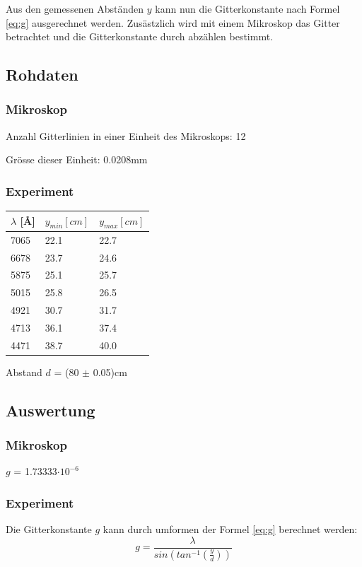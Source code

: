 \documentclass[12pt,a4paper]{article}
\begin{document}
Aus den gemessenen Abst\"anden $y$ kann nun die Gitterkonstante nach Formel \ref{eq:g} ausgerechnet werden. Zus\"astzlich wird mit einem Mikroskop das Gitter betrachtet und die Gitterkonstante durch abz\"ahlen bestimmt.

\subsection*{Rohdaten}
\subsubsection*{Mikroskop}
Anzahl Gitterlinien in einer Einheit des Mikroskops: 12

Gr\"osse dieser Einheit: 0.0208mm

\subsubsection*{Experiment}
\begin{tabular}{|l|l|l|}
\hline
$\lambda$ [\AA]&$y_{min} [cm]$&$y_{max} [cm]$\\
\hline
7065&22.1&22.7\\
6678&23.7&24.6\\
5875&25.1&25.7\\
5015&25.8&26.5\\
4921&30.7&31.7\\
4713&36.1&37.4\\
4471&38.7&40.0\\
\hline
\end{tabular}\vspace{10pt}

Abstand $d$ = (80 $\pm$ 0.05)cm

\subsection*{Auswertung}
\subsubsection*{Mikroskop}
$g$ = 1.73333$\cdot 10^{-6}$

\subsubsection*{Experiment}
Die Gitterkonstante $g$ kann durch umformen der Formel \ref{eq:g} berechnet werden:
\[ g = \frac{\lambda}{sin(tan^{-1}(\frac{y}{d}))} \]
\end{document}
